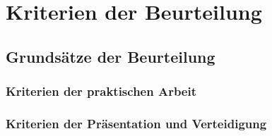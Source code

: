 \chapter				{Kriterien der Beurteilung}				
	\section 			{Grundsätze der Beurteilung}										
\newpage
		\subsection 	{Kriterien der praktischen Arbeit}									
		\subsection 	{Kriterien der Präsentation und Verteidigung}						